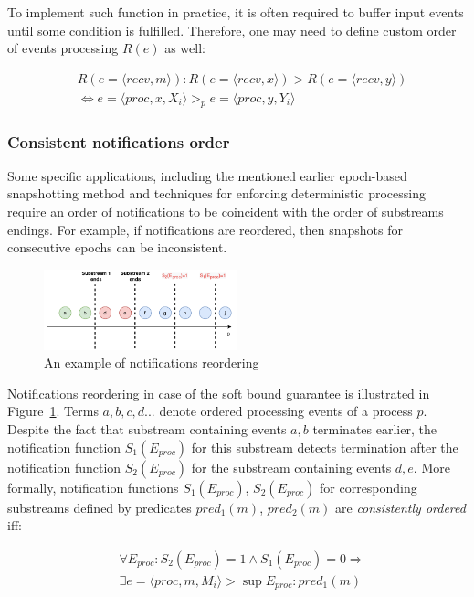 To implement such function in practice, it is often required to buffer input events until some condition is fulfilled. Therefore, one may need to define custom order of events processing $R(e)$ as well:

\begin{align*}
& R(e=\langle recv,m\rangle): R(e=\langle recv, x\rangle) > R(e=\langle recv, y\rangle) \\
& \Longleftrightarrow e=\langle proc,x,X_i\rangle >_p e=\langle proc,y,Y_i\rangle
\end{align*}

\subsubsection{Consistent notifications order}
Some specific applications, including the mentioned earlier epoch-based snapshotting method and techniques for enforcing deterministic processing~\cite{we2018adbis} require an order of notifications to be coincident with the order of substreams endings. For example, if notifications are reordered, then snapshots for consecutive epochs can be inconsistent.

\begin{figure}[htbp]
  \centering
  \includegraphics[width=0.50\textwidth]{pics/notifications-reordering.pdf}
  \caption{An example of notifications reordering}
  \label{notifications_reordering}
\end{figure}

Notifications reordering in case of the soft bound guarantee is illustrated in Figure~\ref{notifications_reordering}. Terms $a,b,c,d...$ denote ordered processing events of a process $p$. Despite the fact that substream containing events $a,b$ terminates earlier, the notification function $S_1(E_{proc})$ for this substream detects termination after the notification function $S_2(E_{proc})$ for the substream containing events $d,e$. More formally, notification functions $S_1(E_{proc})$, $S_2(E_{proc})$ for corresponding substreams defined by predicates $pred_1(m)$, $pred_2(m)$ are {\em consistently ordered} iff:

\begin{align*}
& \forall E_{proc}: S_2(E_{proc})=1 \wedge S_1(E_{proc})=0 \Longrightarrow  \\
& \exists e=\langle proc, m, M_i\rangle > \sup E_{proc} : pred_1(m)
\end{align*}

